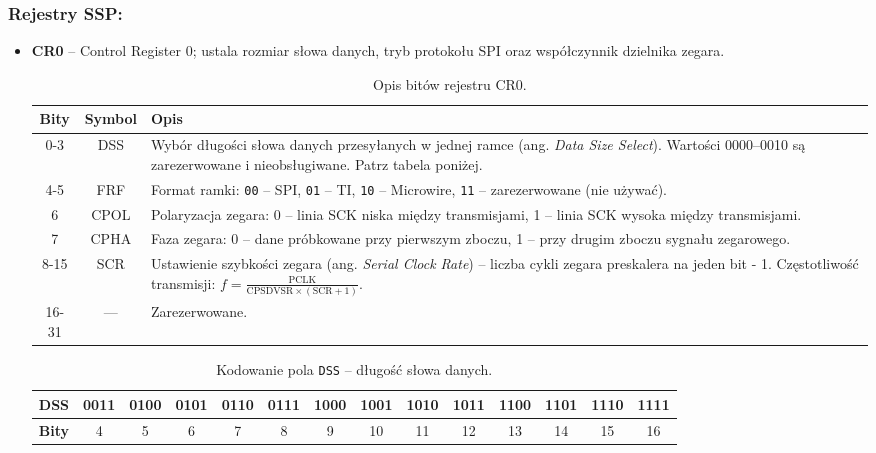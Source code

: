 \subsubsection {Rejestry SSP:}
\begin{itemize}
  \item \textbf{CR0} – Control Register 0; ustala rozmiar słowa danych, tryb protokołu SPI oraz współczynnik dzielnika zegara.

\begin{table}[H]
\centering
\caption{Opis bitów rejestru CR0.}
\vspace{0.5em}
\renewcommand{\arraystretch}{1.2}
\begin{tabular}{|c|c|p{9.5cm}|}
\hline
\textbf{Bity} & \textbf{Symbol} & \textbf{Opis} \\
\hline
0-3     & DSS         & Wybór długości słowa danych przesyłanych w jednej ramce (ang. \textit{Data Size Select}). Wartości 0000–0010 są zarezerwowane i nieobsługiwane. Patrz tabela poniżej. \\
\hline
4-5     & FRF         & Format ramki: \texttt{00} – SPI, \texttt{01} – TI, \texttt{10} – Microwire, \texttt{11} – zarezerwowane (nie używać). \\
\hline
6       & CPOL        & Polaryzacja zegara: 0 – linia SCK niska między transmisjami, 1 – linia SCK wysoka między transmisjami. \\
\hline
7       & CPHA        & Faza zegara: 0 – dane próbkowane przy pierwszym zboczu, 1 – przy drugim zboczu sygnału zegarowego. \\
\hline
8-15    & SCR         & Ustawienie szybkości zegara (ang. \textit{Serial Clock Rate}) – liczba cykli zegara preskalera na jeden bit - 1. Częstotliwość transmisji: $f = \frac{\text{PCLK}}{\text{CPSDVSR} \times (\text{SCR} + 1)}$. \\
\hline
16-31   & —           & Zarezerwowane.\\
\hline
\end{tabular}
\end{table}

\vspace{1em}

\begin{table}[H]
\centering
\caption{Kodowanie pola \texttt{DSS} – długość słowa danych.}
\vspace{0.5em}
\renewcommand{\arraystretch}{1.4}
\begin{tabular}{|c|c|c|c|c|c|c|c|c|c|c|c|c|c|}
\hline
\textbf{DSS} & 0011 & 0100 & 0101 & 0110 & 0111 & 1000 & 1001 & 1010 & 1011 & 1100 & 1101 & 1110 & 1111 \\
\hline
\textbf{Bity} & 4 & 5 & 6 & 7 & 8 & 9 & 10 & 11 & 12 & 13 & 14 & 15 & 16 \\
\hline
\end{tabular}
\end{table}



\end{itemize}
